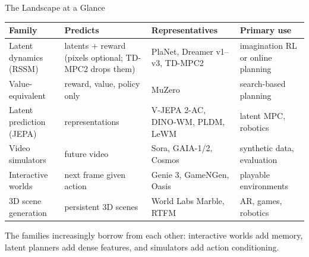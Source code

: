 \begin{frame}{The Landscape at a Glance}
  \footnotesize
  \begin{center}
    \renewcommand{\arraystretch}{1.3}
    \begin{tabular}{@{}p{2.8cm}p{3.1cm}p{3.6cm}p{3.0cm}@{}}
      \hline
      \textbf{Family} & \textbf{Predicts} & \textbf{Representatives} & \textbf{Primary use} \\
      \hline
      Latent dynamics (RSSM) & latents + reward (pixels optional; TD-MPC2 drops them) & PlaNet, Dreamer v1--v3, TD-MPC2 & imagination RL or online planning \\
      Value-equivalent & reward, value, policy only & MuZero & search-based planning \\
      Latent prediction (JEPA) & representations & V-JEPA 2-AC, DINO-WM, PLDM, LeWM & latent MPC, robotics \\
      Video simulators & future video & Sora, GAIA-1/2, Cosmos & synthetic data, evaluation \\
      Interactive worlds & next frame given action & Genie 3, GameNGen, Oasis & playable environments \\
      3D scene generation & persistent 3D scenes & World Labs Marble, RTFM & AR, games, robotics \\
      \hline
    \end{tabular}
  \end{center}
  \vspace{0.3em}
  The families increasingly borrow from each other: interactive worlds add memory, latent planners add dense features, and simulators add action conditioning.
\end{frame}
